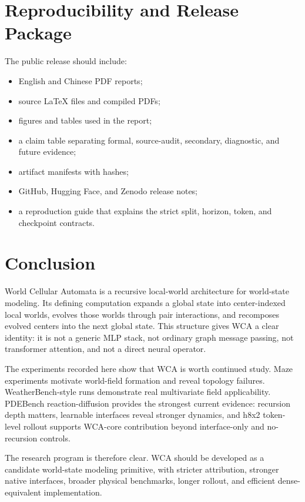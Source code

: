 \documentclass[11pt]{article}
\begin{document}
\section{Reproducibility and Release Package}

The public release should include:

\begin{itemize}[leftmargin=2em]
  \item English and Chinese PDF reports;
  \item source LaTeX files and compiled PDFs;
  \item figures and tables used in the report;
  \item a claim table separating formal, source-audit, secondary, diagnostic,
  and future evidence;
  \item artifact manifests with hashes;
  \item GitHub, Hugging Face, and Zenodo release notes;
  \item a reproduction guide that explains the strict split, horizon, token,
  and checkpoint contracts.
\end{itemize}

\section{Conclusion}

World Cellular Automata is a recursive local-world architecture for
world-state modeling. Its defining computation expands a global state into
center-indexed local worlds, evolves those worlds through pair interactions,
and recomposes evolved centers into the next global state. This structure gives
WCA a clear identity: it is not a generic MLP stack, not ordinary graph message
passing, not transformer attention, and not a direct neural operator.

The experiments recorded here show that WCA is worth continued study. Maze
experiments motivate world-field formation and reveal topology failures.
WeatherBench-style runs demonstrate real multivariate field applicability.
PDEBench reaction-diffusion provides the strongest current evidence: recursion
depth matters, learnable interfaces reveal stronger dynamics, and h8x2
token-level rollout supports WCA-core contribution beyond interface-only and
no-recursion controls.

The research program is therefore clear. WCA should be developed as a candidate
world-state modeling primitive, with stricter attribution, stronger native
interfaces, broader physical benchmarks, longer rollout, and efficient
dense-equivalent implementation.
\end{document}
